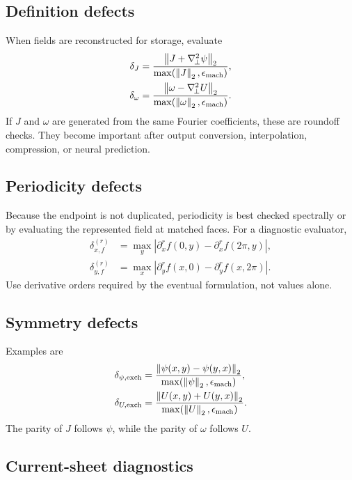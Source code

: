 \documentclass[11pt]{article}
\newcommand{\pd}{\partial}
\newcommand{\Lap}{\nabla_{\!\perp}^{2}}
\newcommand{\norm}[1]{\left\lVert #1\right\rVert}
\begin{document}
\subsection{Definition defects}

When fields are reconstructed for storage, evaluate
\begin{align}
\delta_J
&=\frac{\norm{J+\Lap\psi}_2}
{\max(\norm{J}_2,\epsilon_{\rm mach})},\\
\delta_\omega
&=\frac{\norm{\omega-\Lap U}_2}
{\max(\norm{\omega}_2,\epsilon_{\rm mach})}.
\end{align}
If $J$ and $\omega$ are generated from the same Fourier coefficients, these are roundoff checks. They become important after output conversion, interpolation, compression, or neural prediction.

\subsection{Periodicity defects}

Because the endpoint is not duplicated, periodicity is best checked spectrally or by evaluating the represented field at matched faces. For a diagnostic evaluator,
\begin{align}
\delta_{x,f}^{(r)}
&=\max_y
\left|
\pd_x^r f(0,y)-\pd_x^r f(2\pi,y)
\right|,\\
\delta_{y,f}^{(r)}
&=\max_x
\left|
\pd_y^r f(x,0)-\pd_y^r f(x,2\pi)
\right|.
\end{align}
Use derivative orders required by the eventual formulation, not values alone.

\subsection{Symmetry defects}

Examples are
\begin{align}
\delta_{\psi,\rm exch}
&=\frac{\norm{\psi(x,y)-\psi(y,x)}_2}
{\max(\norm{\psi}_2,\epsilon_{\rm mach})},\\
\delta_{U,\rm exch}
&=\frac{\norm{U(x,y)+U(y,x)}_2}
{\max(\norm{U}_2,\epsilon_{\rm mach})}.
\end{align}
The parity of $J$ follows $\psi$, while the parity of $\omega$ follows $U$.

\subsection{Current-sheet diagnostics}
\end{document}
